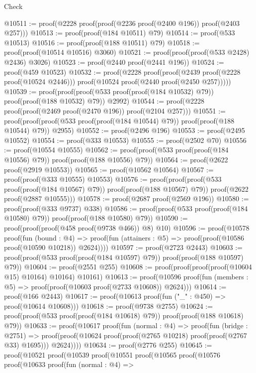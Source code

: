 \begin{lexlean}{Check}
\begin{coremodule}
@10511 := proof(@2228 proof(proof(@2236 proof(@2400 @196)) proof(@2403 @257)))
@10513 := proof(proof(@184 @10511) @79)
@10514 := proof(@533 @10513)
@10516 := proof(proof(@188 @10511) @79)
@10518 := proof(proof(@10514 @10516) @3060)
@10521 := proof(proof(proof(@533 @2428) @2436) @3026)
@10523 := proof(@2440 proof(@2441 @196))
@10524 := proof(@459 @10523)
@10532 := proof(@2228
      proof(proof(@2439 proof(@2228 proof(@10524 @2446)))
          proof(@10524 proof(@2440 proof(@2450 @257)))))
@10539 := proof(proof(proof(@533 proof(proof(@184 @10532) @79)) proof(proof(@188 @10532) @79))
      @2992)
@10544 := proof(@2228 proof(proof(@2469 proof(@2470 @196)) proof(@2104 @257)))
@10551 := proof(proof(proof(@533 proof(proof(@184 @10544) @79)) proof(proof(@188 @10544) @79))
      @2955)
@10552 := proof(@2496 @196)
@10553 := proof(@2495 @10552)
@10554 := proof(@333 @10553)
@10555 := proof(@2502 @70)
@10556 := proof(@10554 @10555)
@10562 := proof(proof(@533 proof(proof(@184 @10556) @79)) proof(proof(@188 @10556) @79))
@10564 := proof(@2622 proof(@2919 @10553))
@10565 := proof(@10562 @10564)
@10567 := proof(proof(@333 @10555) @10553)
@10576 := proof(proof(proof(@533 proof(proof(@184 @10567) @79)) proof(proof(@188 @10567) @79))
      proof(@2622 proof(@2887 @10555)))
@10578 := proof(@2687 proof(@2569 @196))
@10580 := proof(proof(@333 @9737) @338)
@10586 := proof(proof(@533 proof(proof(@184 @10580) @79)) proof(proof(@188 @10580) @79))
@10590 := proof(proof(proof(@458 proof(@9738 @466)) @8) @10)
@10596 := proof(@10578
      proof(fun (bound : @4) =>
        proof(fun (attainers : @5) => proof(proof(@10586 proof(@10590 @10218)) @2624))))
@10597 := proof(@2723 @2443)
@10603 := proof(proof(@533 proof(proof(@184 @10597) @79)) proof(proof(@188 @10597) @79))
@10604 := proof(@2551 @255)
@10608 := proof(proof(proof(proof(@10604 @15) @10164) @10164) @10161)
@10613 := proof(@10596 proof(fun (members : @5) => proof(proof(@10603 proof(@2733 @10608)) @2624)))
@10614 := proof(@166 @2443)
@10617 := proof(@10613 proof(fun ("_" : @450) => proof(@10614 @10608)))
@10618 := proof(@9738 @2755)
@10624 := proof(proof(@533 proof(proof(@184 @10618) @79)) proof(proof(@188 @10618) @79))
@10633 := proof(@10617
      proof(fun (normal : @4) =>
        proof(fun (bridge : @2751) =>
          proof(proof(@10624 proof(proof(@2765 @10218) proof(proof(@2767 @33) @1695))) @2624))))
@10634 := proof(@2776 @255)
@10645 := proof(@10521
      proof(@10539
          proof(@10551
              proof(@10565
                  proof(@10576
                      proof(@10633
                          proof(fun (normal : @4) =>

\end{coremodule}
\end{lexlean}
